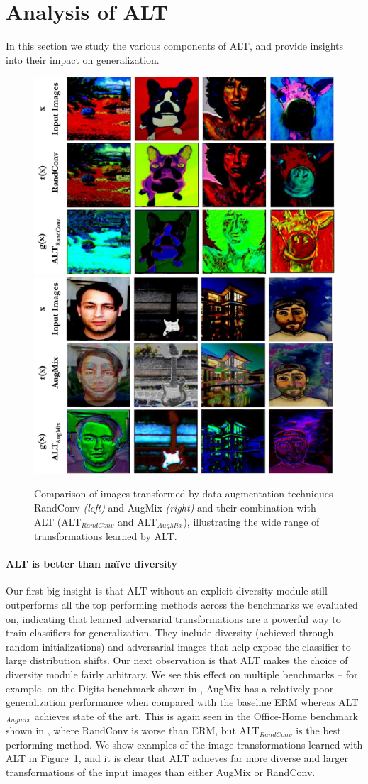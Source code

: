 \section{Analysis of ALT}
In this section we study the various components of ALT, and provide insights into their impact on generalization. 
\begin{figure}
    \centering
    \includegraphics[width=0.48\linewidth]{alt/figures/viz_randconv_alt.pdf}
    \quad\includegraphics[width=0.48\linewidth]{alt/figures/viz_augmix_alt.pdf}
    \caption{Comparison of images transformed by data augmentation techniques RandConv \textit{(left)} and AugMix \textit{(right)} and their combination with ALT (ALT$_{RandConv}$ and ALT$_{AugMix}$), 
    illustrating the wide range of transformations learned by ALT.}
    \label{fig:viz_augs}
\end{figure}

\paragraph{ALT is better than na\"ive diversity} Our first big insight is that ALT without an explicit diversity module still outperforms all the top performing methods across the benchmarks we evaluated on, indicating that learned adversarial transformations are a powerful way to train classifiers for generalization. They include diversity (achieved through random initializations) and adversarial images that help expose the classifier to large distribution shifts. Our next observation is that ALT makes the choice of diversity module fairly arbitrary. We see this effect on multiple benchmarks -- for example, on the Digits benchmark shown in  , AugMix has a relatively poor generalization performance when compared with the baseline ERM whereas ALT$_{Augmix}$ achieves state of the art. This is again seen in the Office-Home benchmark shown in , where RandConv is worse than ERM, but ALT$_{RandConv}$ is the best performing method. We show examples of the image transformations learned with ALT in Figure~\ref{fig:viz_augs}, and it is clear that ALT achieves far more diverse and larger transformations of the input images than either AugMix or RandConv.


